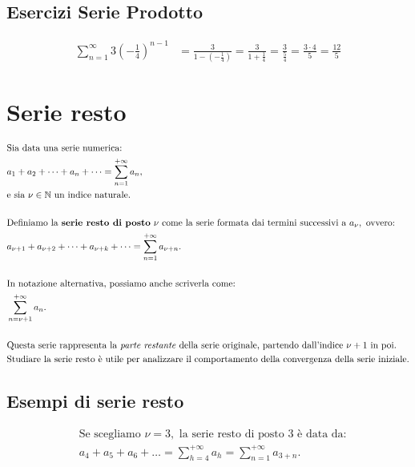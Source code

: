 \documentclass{article}
\begin{document}
\subsection*{Esercizi Serie Prodotto}
\begin{align*}
    \sum_{n=1}^{\infty} 3 \left(-\frac{1}{4}\right)^{n-1} &= \frac{3}{1 - \left( -\frac{1}{4}\right)} = \frac{3}{1 + \frac{1}{4}} = \frac{3}{\frac{5}{4}} = \frac{3 \cdot 4}{5} = \frac{12}{5}
\end{align*}

\section* {Serie resto}
\begin{align*}
    &\text{Sia data una serie numerica:} \\
    &a_1 + a_2 + \dots + a_n + \dots = \sum_{n=1}^{+\infty} a_n, \\
    &\text{e sia } \nu \in \mathbb{N} \text{ un indice naturale.} \\
    \\
    &\text{Definiamo la \textbf{serie resto di posto} } \nu \text{ come la serie formata dai termini successivi a } a_\nu, \text{ ovvero:} \\
    &a_{\nu+1} + a_{\nu+2} + \dots + a_{\nu+k} + \dots = \sum_{n=1}^{+\infty} a_{\nu+n}. \\
    \\
    &\text{In notazione alternativa, possiamo anche scriverla come:} \\
    &\sum_{n=\nu+1}^{+\infty} a_n. \\
    \\
    &\text{Questa serie rappresenta la \emph{parte restante} della serie originale, partendo dall'indice } \nu+1 \text{ in poi.} \\
    &\text{Studiare la serie resto è utile per analizzare il comportamento della convergenza della serie iniziale.} \\
\end{align*}

\subsection*{Esempi di serie resto}

\begin{align*}
    &\text{Se scegliamo } \nu = 3, \text{ la serie resto di posto 3 è data da:} \\
    &a_4 + a_5 + a_6 + \dots = \sum_{h=4}^{+\infty} a_h = \sum_{n=1}^{+\infty} a_{3+n}.
\\
\end{align*}
\end{document}
